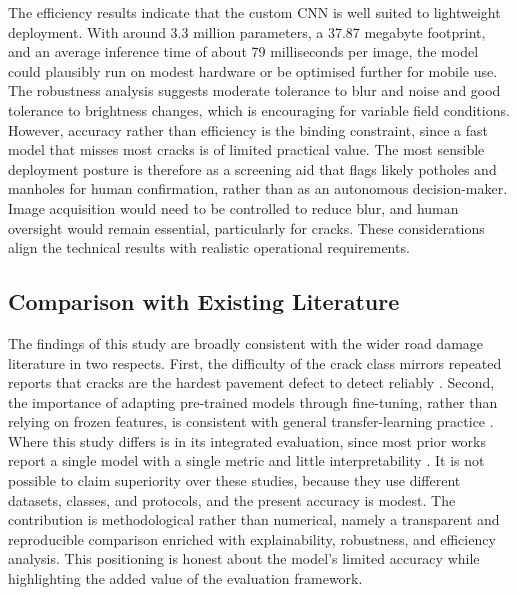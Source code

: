 \documentclass[preprint,12pt]{elsarticle}
\begin{document}
The efficiency results indicate that the custom CNN is well suited to lightweight deployment.
With around 3.3 million parameters, a 37.87 megabyte footprint, and an average inference time of about 79 milliseconds per image, the model could plausibly run on modest hardware or be optimised further for mobile use.
The robustness analysis suggests moderate tolerance to blur and noise and good tolerance to brightness changes, which is encouraging for variable field conditions.
However, accuracy rather than efficiency is the binding constraint, since a fast model that misses most cracks is of limited practical value.
The most sensible deployment posture is therefore as a screening aid that flags likely potholes and manholes for human confirmation, rather than as an autonomous decision-maker.
Image acquisition would need to be controlled to reduce blur, and human oversight would remain essential, particularly for cracks.
These considerations align the technical results with realistic operational requirements.

\subsection{Comparison with Existing Literature}

The findings of this study are broadly consistent with the wider road damage literature in two respects.
First, the difficulty of the crack class mirrors repeated reports that cracks are the hardest pavement defect to detect reliably \cite{guo2023pavement, zhu2024lightweight}.
Second, the importance of adapting pre-trained models through fine-tuning, rather than relying on frozen features, is consistent with general transfer-learning practice \cite{pan2009survey}.
Where this study differs is in its integrated evaluation, since most prior works report a single model with a single metric and little interpretability \cite{naik2023pothole, murty2024detection}.
It is not possible to claim superiority over these studies, because they use different datasets, classes, and protocols, and the present accuracy is modest.
The contribution is methodological rather than numerical, namely a transparent and reproducible comparison enriched with explainability, robustness, and efficiency analysis.
This positioning is honest about the model's limited accuracy while highlighting the added value of the evaluation framework.
\end{document}
